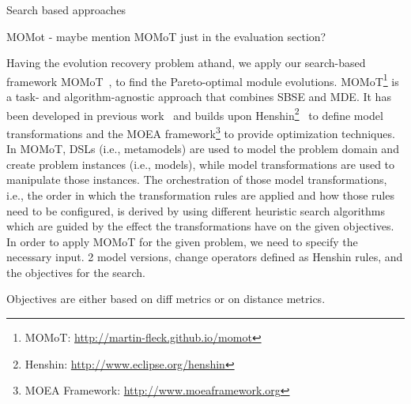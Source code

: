 Search based approaches

MOMot - maybe mention MOMoT just in the evaluation section? 



Having the evolution recovery problem athand, we apply our search-based framework MOMoT~\cite{Fleck15,FleckTW16}, to find the Pareto-optimal module evolutions. MOMoT\footnote{MOMoT: \url{http://martin-fleck.github.io/momot}} is a task- and algorithm-agnostic approach that combines SBSE and MDE.
It has been developed in previous work~\cite{Fleck15} and builds upon Henshin\footnote{Henshin: \url{http://www.eclipse.org/henshin}}~\cite{Arendt10} to define model transformations and the MOEA framework\footnote{MOEA Framework: \url{http://www.moeaframework.org}} to provide optimization techniques. In MOMoT, DSLs (i.e., metamodels) are used to model the problem domain and create problem instances (i.e., models), while model transformations are used to manipulate those instances.
The orchestration of those model transformations, i.e., the order in which the transformation rules are applied and how those rules need to be configured, is derived by using different heuristic search algorithms which are guided by the effect the transformations have on the given objectives.
In order to apply MOMoT for the given problem, we need to specify the necessary input.
2 model versions, change operators defined as Henshin rules, and the objectives for the search.

Objectives are either based on diff metrics or on distance metrics. 
